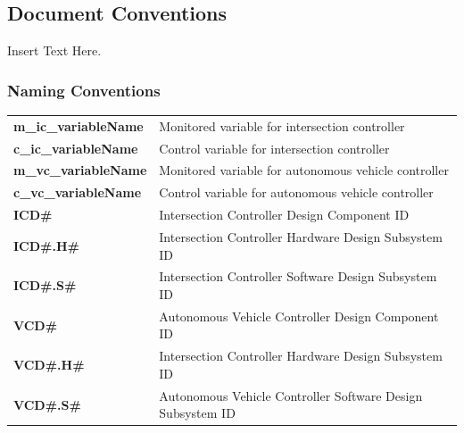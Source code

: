 \documentclass [11pt]{article}
\begin{document}
\subsection{Document Conventions}
Insert Text Here.

 
\subsubsection{Naming Conventions}

\begin{longtable}{ |p{ } p{ }|}  \hline
\textbf{m\_ic\_variableName} & Monitored variable for intersection controller \\ 

\cellcolor{tableCell}\textbf{c\_ic\_variableName}  & \cellcolor{tableCell}Control variable for intersection controller \\ 

\textbf{m\_vc\_variableName} & Monitored variable for autonomous vehicle controller \\ 

\cellcolor{tableCell}\textbf{c\_vc\_variableName}  & \cellcolor{tableCell}Control variable for autonomous vehicle controller \\ 

\textbf{ICD\#} & Intersection Controller Design Component ID \\ 

\cellcolor{tableCell}\textbf{ICD\#.H\#}  & \cellcolor{tableCell}Intersection Controller Hardware Design Subsystem ID \\

\textbf{ICD\#.S\#} & Intersection Controller Software Design Subsystem ID \\ 

\cellcolor{tableCell}\textbf{VCD\#}  & \cellcolor{tableCell}Autonomous Vehicle Controller Design Component ID\\  

\textbf{VCD\#.H\#} & Intersection Controller Hardware Design Subsystem ID \\ 

\cellcolor{tableCell}\textbf{VCD\#.S\#}  & \cellcolor{tableCell}Autonomous Vehicle Controller Software Design Subsystem ID \\\hline



\end{longtable}


%
\end{document}
